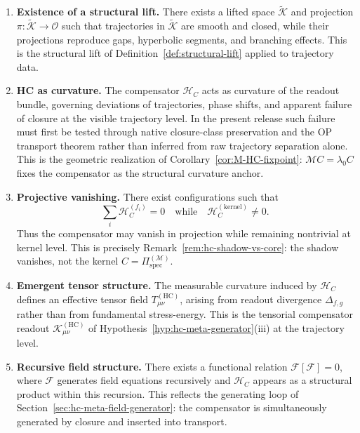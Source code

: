 \begin{theorem}
\begin{enumerate}[label=(\arabic*)]
 \item \textbf{Existence of a structural lift.}
 There exists a lifted space $\tilde{\mathcal{K}}$ and projection
 $\pi : \tilde{\mathcal{K}} \to \mathcal{O}$ such that trajectories
 in $\tilde{\mathcal{K}}$ are smooth and closed, while their
 projections reproduce gaps, hyperbolic segments, and branching
 effects. This is the structural lift of
 Definition~\ref{def:structural-lift} applied to trajectory data.

 \item \textbf{HC as curvature.}
 The compensator $\mathcal{H}_C$ acts as curvature of the readout
 bundle, governing deviations of trajectories, phase shifts, and
 apparent failure of closure at the visible trajectory level. In the
 present release such failure must first be tested through native
 closure-class preservation and the OP transport theorem rather than
 inferred from raw trajectory separation alone. This is the geometric
 realization of Corollary~\ref{cor:M-HC-fixpoint}: $\mathcal{M}C = \lambda_0 C$
 fixes the compensator as the structural curvature anchor.

 \item \textbf{Projective vanishing.}
 There exist configurations such that
 \[
 \sum_i \mathcal{H}_C^{(f_i)} = 0
 \quad\text{while}\quad
 \mathcal{H}_C^{(\mathrm{kernel})} \neq 0.
 \]
 Thus the compensator may vanish in projection while remaining
 nontrivial at kernel level. This is precisely
 Remark~\ref{rem:hc-shadow-vs-core}: the shadow vanishes, not
 the kernel $C = \Pi^{(\mathcal{M})}_{\mathrm{spec}}$.

 \item \textbf{Emergent tensor structure.}
 The measurable curvature induced by $\mathcal{H}_C$ defines an
 effective tensor field $T_{\mu\nu}^{(\mathrm{HC})}$, arising from
 readout divergence $\Delta_{f,g}$ rather than from fundamental
 stress-energy. This is the tensorial compensator readout
 $\mathcal{K}_{\mu\nu}^{(\mathrm{HC})}$ of
 Hypothesis~\ref{hyp:hc-meta-generator}(iii) at the trajectory level.

 \item \textbf{Recursive field structure.}
 There exists a functional relation
 $\mathcal{F}[\mathcal{F}] = 0$,
 where $\mathcal{F}$ generates field equations recursively and
 $\mathcal{H}_C$ appears as a structural product within this
 recursion. This reflects the generating loop of
 Section~\ref{sec:hc-meta-field-generator}: the compensator is
 simultaneously generated by closure and inserted into transport.
\end{enumerate}
\end{theorem}


